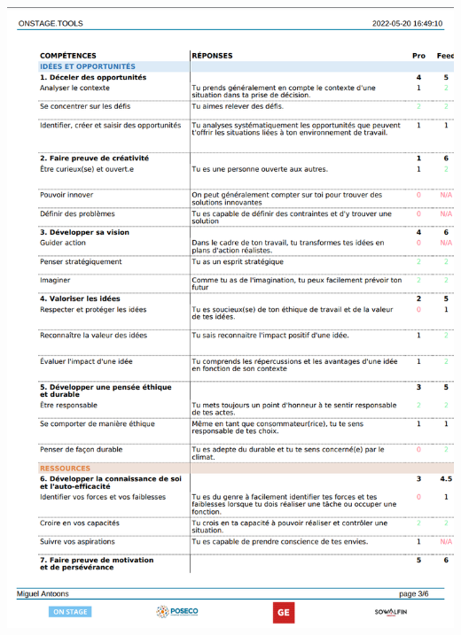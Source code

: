 \documentclass[11pt]{article}
\begin{document}
\includegraphics*[scale=0.34]{Screenshot from 2022-05-22 21-04-11.png}

\newpage
\end{document}

